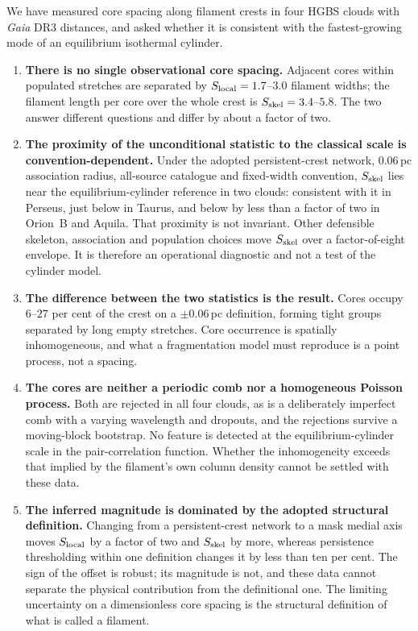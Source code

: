 \documentclass[usenatbib,twoside,twocolumn]{mnras}
\begin{document}
We have measured core spacing along filament crests in four HGBS clouds with \textit{Gaia} DR3 distances, and asked whether it is consistent with the fastest-growing mode of an equilibrium isothermal cylinder.

\begin{enumerate}\setlength{\itemsep}{2pt}
\item \textbf{There is no single observational core spacing.} Adjacent cores within populated stretches are separated by $S_{\rm local}=1.7$--$3.0$ filament widths; the filament length per core over the whole crest is $S_{\rm skel}=3.4$--$5.8$. The two answer different questions and differ by about a factor of two.
\item \textbf{The proximity of the unconditional statistic to the classical scale is convention-dependent.} Under the adopted persistent-crest network, $0.06$\,pc association radius, all-source catalogue and fixed-width convention, $S_{\rm skel}$ lies near the equilibrium-cylinder reference in two clouds: consistent with it in Perseus, just below in Taurus, and below by less than a factor of two in Orion~B and Aquila. That proximity is not invariant. Other defensible skeleton, association and population choices move $S_{\rm skel}$ over a factor-of-eight envelope. It is therefore an operational diagnostic and not a test of the cylinder model.
\item \textbf{The difference between the two statistics is the result.} Cores occupy $6$--$27$ per cent of the crest on a $\pm0.06$\,pc definition, forming tight groups separated by long empty stretches. Core occurrence is spatially inhomogeneous, and what a fragmentation model must reproduce is a point process, not a spacing.
\item \textbf{The cores are neither a periodic comb nor a homogeneous Poisson process.} Both are rejected in all four clouds, as is a deliberately imperfect comb with a varying wavelength and dropouts, and the rejections survive a moving-block bootstrap. No feature is detected at the equilibrium-cylinder scale in the pair-correlation function. Whether the inhomogeneity exceeds that implied by the filament's own column density cannot be settled with these data.
\item \textbf{The inferred magnitude is dominated by the adopted structural definition.} Changing from a persistent-crest network to a mask medial axis moves $S_{\rm local}$ by a factor of two and $S_{\rm skel}$ by more, whereas persistence thresholding within one definition changes it by less than ten per cent. The sign of the offset is robust; its magnitude is not, and these data cannot separate the physical contribution from the definitional one. The limiting uncertainty on a dimensionless core spacing is the structural definition of what is called a filament.

\end{enumerate}
\end{document}

